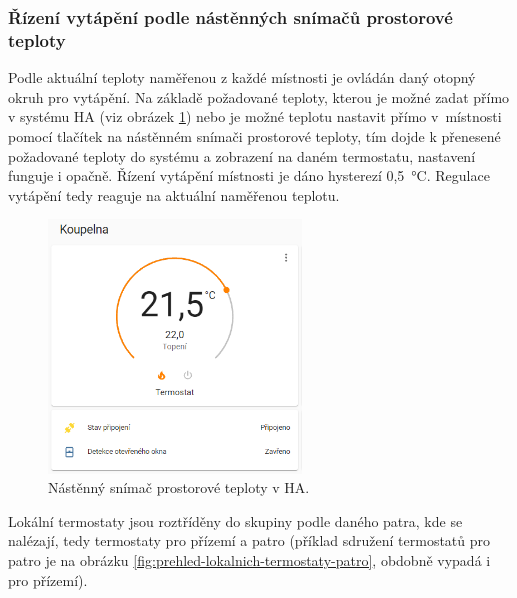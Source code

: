 \subsubsection{Řízení vytápění podle nástěnných snímačů prostorové teploty}
\label{sec:rizeni-vytapeni-podle-nastennych-snimacu-prostorove-teploty}
Podle aktuální teploty naměřenou z každé místnosti je ovládán daný otopný okruh pro vytápění. Na základě požadované teploty, kterou je možné zadat přímo v systému HA (viz obrázek \ref{fig:lokalni-termostat-ha}) nebo je možné teplotu nastavit přímo v~místnosti pomocí tlačítek na nástěnném snímači prostorové teploty, tím dojde k přenesené požadované teploty do systému a zobrazení na daném termostatu, nastavení funguje i opačně. Řízení vytápění místnosti je dáno hysterezí 0,5~°C. Regulace vytápění tedy reaguje na aktuální naměřenou teplotu.

\begin{figure}[H]
    \centering
    \includegraphics[width=0.6\textwidth]{images/software-ha/lokalni-termostat-ha.png}
    \caption{Nástěnný snímač prostorové teploty v HA.}
    \label{fig:lokalni-termostat-ha}
\end{figure}

Lokální termostaty jsou roztříděny do skupiny podle daného patra, kde se nalézají, tedy termostaty pro přízemí a patro (příklad sdružení termostatů pro patro je na obrázku \ref{fig:prehled-lokalnich-termostaty-patro}, obdobně vypadá i pro přízemí).


